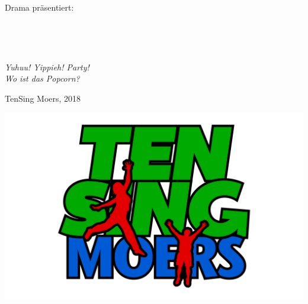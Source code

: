 \begin{center}
\color{white}\hspace{-28mm}
\begin{Huge}
Drama präsentiert:
\end{Huge}

\color{black}
\vspace{155mm}
\begin{Huge}
\\
\end{Huge}

\vspace{35mm}
\begin{Large}
\color{white}
\contourlength{0.75pt} %
\\
\end{Large}

\vspace{30mm}
\end{center}

\begin{flushright}
\color{white}
\textit{Yuhuu! Yippieh! Party!}\\
\textit{Wo ist das Popcorn?}
\end{flushright}

\vspace{-10mm}

\begin{center}
\color{white}
\Large TenSing Moers, 2018
\end{center}

\clearpage
\restoregeometry
\tableofcontents

\begin{center}
\vspace*{\fill}
\includegraphics[scale=.30,trim=80mm 20mm 80mm 20mm]{res/TEN_SING_Logo}
\end{center}

